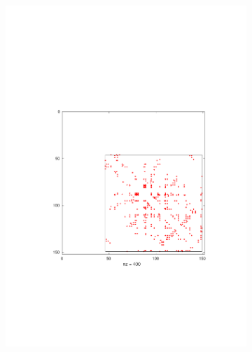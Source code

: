 \documentclass[11pt]{article}\usepackage[]{graphicx}\usepackage[]{color}
\theoremstyle{plain}
\begin{document}
\begin{multicols*}{2}
\begin{figure}[p]
\begin{subfigure}[b]{.5\textwidth}
      \includegraphics[width=\textwidth, trim=2cm 7cm 2cm 7cm, clip]{../figures/CADH1_HUMAN_e3_n2_m40_Predicted_Constraints}
      \caption{ }
      \label{fig:human_fig2}
    \end{subfigure}\\
    \begin{subfigure}[b]{.49\textwidth}

\end{subfigure}
\end{figure}
\end{multicols*}
\end{document}
